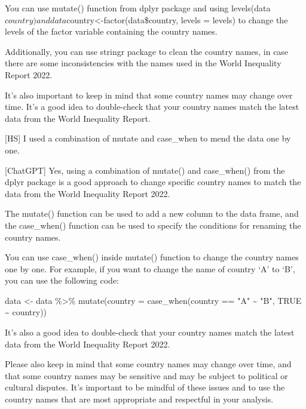 \documentclass[
]{bxjsbook}
\newenvironment{Shaded}{\begin{snugshade}}{\end{snugshade}}
\newcommand{\AttributeTok}[1]{\textcolor[rgb]{0.77,0.63,0.00}{#1}}
\newcommand{\ConstantTok}[1]{\textcolor[rgb]{0.00,0.00,0.00}{#1}}
\newcommand{\FunctionTok}[1]{\textcolor[rgb]{0.00,0.00,0.00}{#1}}
\newcommand{\NormalTok}[1]{#1}
\newcommand{\OtherTok}[1]{\textcolor[rgb]{0.56,0.35,0.01}{#1}}
\newcommand{\SpecialCharTok}[1]{\textcolor[rgb]{0.00,0.00,0.00}{#1}}
\newcommand{\StringTok}[1]{\textcolor[rgb]{0.31,0.60,0.02}{#1}}
\theoremstyle{definition}
\theoremstyle{definition}
\theoremstyle{definition}
\theoremstyle{definition}
\theoremstyle{remark}
\begin{document}
You can use mutate() function from dplyr package and using levels(data\(country) and data\)country\textless-factor(data\$country, levels = levels) to change the levels of the factor variable containing the country names.

Additionally, you can use stringr package to clean the country names, in case there are some inconsistencies with the names used in the World Inequality Report 2022.

It's also important to keep in mind that some country names may change over time. It's a good idea to double-check that your country names match the latest data from the World Inequality Report.

{[}HS{]} I used a combination of mutate and case\_when to mend the data one by one.

{[}ChatGPT{]} Yes, using a combination of mutate() and case\_when() from the dplyr package is a good approach to change specific country names to match the data from the World Inequality Report 2022.

The mutate() function can be used to add a new column to the data frame, and the case\_when() function can be used to specify the conditions for renaming the country names.

You can use case\_when() inside mutate() function to change the country names one by one. For example, if you want to change the name of country `A' to `B', you can use the following code:

\begin{Shaded}
\begin{Highlighting}[]
\NormalTok{data }\OtherTok{\textless{}{-}}\NormalTok{ data }\SpecialCharTok{\%\textgreater{}\%}
\FunctionTok{mutate}\NormalTok{(}\AttributeTok{country =} \FunctionTok{case\_when}\NormalTok{(country }\SpecialCharTok{==} \StringTok{"A"} \SpecialCharTok{\textasciitilde{}} \StringTok{"B"}\NormalTok{,}
                           \ConstantTok{TRUE} \SpecialCharTok{\textasciitilde{}}\NormalTok{ country))}
\end{Highlighting}
\end{Shaded}

It's also a good idea to double-check that your country names match the latest data from the World Inequality Report 2022.

Please also keep in mind that some country names may change over time, and that some country names may be sensitive and may be subject to political or cultural disputes. It's important to be mindful of these issues and to use the country names that are most appropriate and respectful in your analysis.
\end{document}
